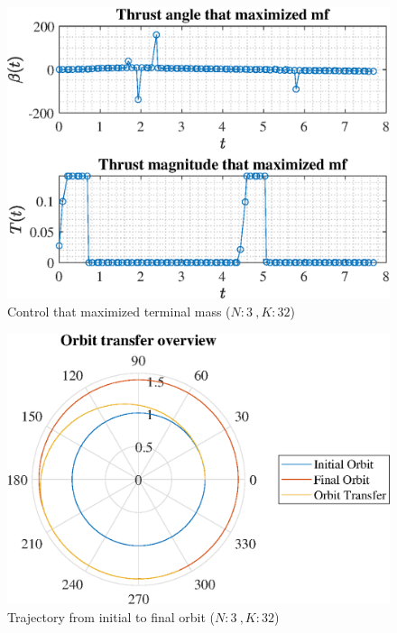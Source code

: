 \documentclass[]{article}
\begin{document}
	\begin{figure}
		\centering
		\includegraphics[scale=0.75]{control_N3_K32_C2_mf.eps}
		\caption{Control that maximized terminal mass (\(N:3\ , K:32\))}
		\label{fig:control_N3_K32_C2_mf}
	\end{figure}
	\begin{figure}
		\centering
		\includegraphics[scale=0.75]{orbit_N3_K32_C2_mf.eps}
		\caption{Trajectory from initial to final orbit (\(N:3\ , K:32\))}
		\label{fig:orbit_N3_K32_C2_mf}
	\end{figure}
\end{document}

